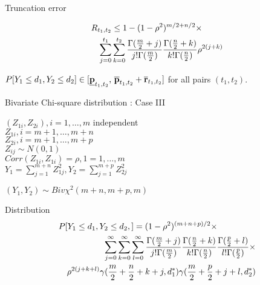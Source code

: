 \documentclass{slides}
\begin{document}
\begin{slide}
Truncation error

\begin{eqnarray*}
\lefteqn{R_{t_1, t_2} \leq 1- (1-\rho^2)^{m/2 + n/2} \times } \\
  & & \sum_{j=0}^{t_1} \sum_{k=0}^{t_2} 
  \frac{\Gamma (\frac{m}{2}+j)}{ j! \Gamma (\frac{m}{2}) }
  \frac{\Gamma (\frac{n}{2}+k)}{ k! \Gamma (\frac{n}{2}) }
  \rho^{2(j +k)} 
\end{eqnarray*}

$P[Y_1 \leq d_1, Y_2 \leq d_2] \in
 [ \underline{\bf p}_{t_1,t_2} , \,
	 \overline{\bf p}_{t_1,t_2} + \overline{\bf r}_{t_1,t_2}]$ 
for all pairs $(t_1,t_2)$.
\end{slide}
\begin{slide}
\begin{center}
Bivariate Chi-square distribution : Case III
\end{center}
$(Z_{1i}, Z_{2i}), i = 1,\ldots,m $ independent \\
$Z_{1i}, i = m+1, \ldots, m+n$ \\
$Z_{2i}, i = m+1, \ldots, m+p$ \\
$Z_{ij} \sim N(0,1)$ \\
$Corr(Z_{1i},Z_{1i}) = \rho, 1=1,\ldots, m$ \\
$Y_1 = \sum_{j=1}^{m+n} Z_{1j}^2, Y_2 = \sum_{j=1}^{m+p} Z_{2j}^2$

$(Y_1, Y_2) \sim Biv\chi^2(m+n,m+p,m)$

Distribution
\begin{eqnarray*}
\lefteqn{P[Y_1 \leq d_1, Y_2 \leq d_2, ] =
   (1-\rho^2)^{(m+n+p)/2} \times } \\
 	& & \sum_{j=0}^\infty \sum_{k=0}^\infty  \sum_{l=0}^\infty 
 	\frac{ \Gamma (\frac{m}{2}+j)}{ j! \Gamma (\frac{m}{2})  }
   \frac{ \Gamma (\frac{n}{2}+k)}{ k! \Gamma (\frac{n}{2})  }
   \frac{ \Gamma (\frac{p}{2}+l)}{ l! \Gamma (\frac{p}{2})  } \times \\
  & & \rho^{2(j+k+l)} 
	\gamma (\frac{m}{2}+\frac{n}{2}+k+j, d_1^* )  
 \gamma (\frac{m}{2}+\frac{p}{2}+j+l, d_2^* )  
\end{eqnarray*}

\end{slide}
\end{document}
